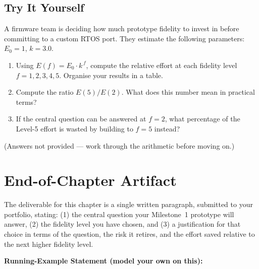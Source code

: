 \subsection*{Try It Yourself}

A firmware team is deciding how much prototype fidelity to invest in before
committing to a custom RTOS port. They estimate the following parameters:
$E_0 = 1$, $k = 3.0$.

\begin{enumerate}
  \item Using $E(f) = E_0 \cdot k^{\,f}$, compute the relative effort at each
        fidelity level $f = 1, 2, 3, 4, 5$. Organise your results in a table.
  \item Compute the ratio $E(5)/E(2)$. What does this number mean in
        practical terms?
  \item If the central question can be answered at $f = 2$, what percentage of
        the Level-5 effort is wasted by building to $f = 5$ instead?
\end{enumerate}

\noindent(Answers not provided --- work through the arithmetic before moving on.)

\section*{End-of-Chapter Artifact}
\label{sec:ch2-artifact}


The deliverable for this chapter is a single written paragraph, submitted
to your portfolio, stating: (1) the central question your Milestone~1
prototype will answer, (2) the fidelity level you have chosen, and (3) a
justification for that choice in terms of the question, the risk it retires,
and the effort saved relative to the next higher fidelity level.

\bigskip
\noindent\textbf{Running-Example Statement (model your own on this):}


